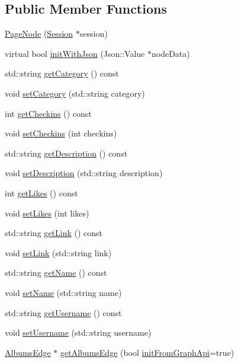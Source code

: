 \subsection*{Public Member Functions}
\begin{DoxyCompactItemize}
\item 
\hyperlink{classfl4cpp_1_1_page_node_a55e13e309ef5fcdf216eef54cfac2427}{Page\+Node} (\hyperlink{classfl4cpp_1_1_session}{Session} $\ast$session)
\item 
virtual bool \hyperlink{classfl4cpp_1_1_page_node_a392ad09e7602c9dd957e2ff1216c7e41}{init\+With\+Json} (Json\+::\+Value $\ast$node\+Data)
\item 
std\+::string \hyperlink{classfl4cpp_1_1_page_node_a58e782071754b04b5ac567f4b7494e55}{get\+Category} () const 
\item 
void \hyperlink{classfl4cpp_1_1_page_node_ac249d3f0cfed8435c4081cc6a37b57dd}{set\+Category} (std\+::string category)
\item 
int \hyperlink{classfl4cpp_1_1_page_node_aaeb69a3c7ad76b65f5f128e5534f51c7}{get\+Checkins} () const 
\item 
void \hyperlink{classfl4cpp_1_1_page_node_a723ffd8ddb8cffb47671b123748b96c5}{set\+Checkins} (int checkins)
\item 
std\+::string \hyperlink{classfl4cpp_1_1_page_node_a3c349081250d63cd3e076dac4c55c0ab}{get\+Description} () const 
\item 
void \hyperlink{classfl4cpp_1_1_page_node_a15bf36e7de847c015a2895a941f418ba}{set\+Description} (std\+::string description)
\item 
int \hyperlink{classfl4cpp_1_1_page_node_a5d8185bd12a28c467fbd45ea9d3e179f}{get\+Likes} () const 
\item 
void \hyperlink{classfl4cpp_1_1_page_node_a835f7296d50c1d24a20e9de1020b0389}{set\+Likes} (int likes)
\item 
std\+::string \hyperlink{classfl4cpp_1_1_page_node_a0360a44ad9fc05490ace0362f9f6504e}{get\+Link} () const 
\item 
void \hyperlink{classfl4cpp_1_1_page_node_a9e9443965e4a64a5b3b64e69350a59c9}{set\+Link} (std\+::string link)
\item 
std\+::string \hyperlink{classfl4cpp_1_1_page_node_abbe4c31d54e425711bb4f43c31c68289}{get\+Name} () const 
\item 
void \hyperlink{classfl4cpp_1_1_page_node_ae32d733424dbbd08a0bb96f37ce4aaf8}{set\+Name} (std\+::string name)
\item 
std\+::string \hyperlink{classfl4cpp_1_1_page_node_a54bd07b6ce7573e96cf48a458e46c8ab}{get\+Username} () const 
\item 
void \hyperlink{classfl4cpp_1_1_page_node_a1bf6260deb53b983364ce427512e6382}{set\+Username} (std\+::string username)
\item 
\hyperlink{classfl4cpp_1_1_albums_edge}{Albums\+Edge} $\ast$ \hyperlink{classfl4cpp_1_1_page_node_a1366c8f74f8d04610125f9168a372579}{get\+Albums\+Edge} (bool \hyperlink{classfl4cpp_1_1_node_a1dd4594ffd7eb08e9e8c5031d2109a59}{init\+From\+Graph\+Api}=true)
\end{DoxyCompactItemize}

